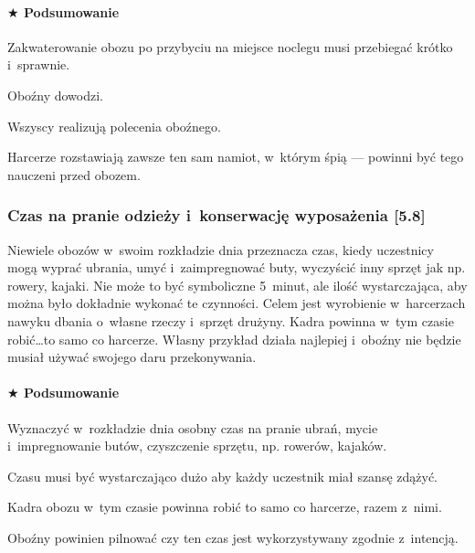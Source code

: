 \documentclass[a5paper,10pt,titlepage,twoside]{article}
\newcommand*{\thecheckbox}{\hss$\Box$} %
\newenvironment*{checklist}
{\list{}{%
\renewcommand*{\makelabel}[1]{\thecheckbox}}}
{\endlist}
\begin{document}
\paragraph{$\bigstar$ Podsumowanie}
\begin{checklist}
\item Zakwaterowanie obozu po przybyciu na miejsce noclegu musi przebiegać krótko i~sprawnie.
\item Oboźny dowodzi.
\item Wszyscy realizują polecenia oboźnego.
\item Harcerze rozstawiają zawsze ten sam namiot, w~którym śpią --- powinni być tego nauczeni przed obozem.
\end{checklist}
\subsubsection{Czas na pranie odzieży i~konserwację wyposażenia [5.8]}
Niewiele obozów w~swoim rozkładzie dnia przeznacza czas, kiedy uczestnicy mogą wyprać ubrania, umyć i~zaimpregnować buty, wyczyścić inny sprzęt jak np. rowery, kajaki. Nie może to być symboliczne 5~minut, ale ilość wystarczająca, aby można było dokładnie wykonać te czynności. Celem jest wyrobienie w~harcerzach nawyku dbania o~własne rzeczy i~sprzęt drużyny. Kadra powinna w~tym czasie robić\ldots to samo co harcerze. Własny przykład działa najlepiej i~oboźny nie będzie musiał używać swojego daru przekonywania.
\paragraph{$\bigstar$ Podsumowanie}
\begin{checklist}
\item Wyznaczyć w~rozkładzie dnia osobny czas na pranie ubrań, mycie i~impregnowanie butów, czyszczenie sprzętu, np. rowerów, kajaków.
\item Czasu musi być wystarczająco dużo aby każdy uczestnik miał szansę zdążyć.
\item Kadra obozu w~tym czasie powinna robić to samo co harcerze, razem z~nimi.
\item Oboźny powinien pilnować czy ten czas jest wykorzystywany zgodnie z~intencją.
\end{checklist}
\end{document}
